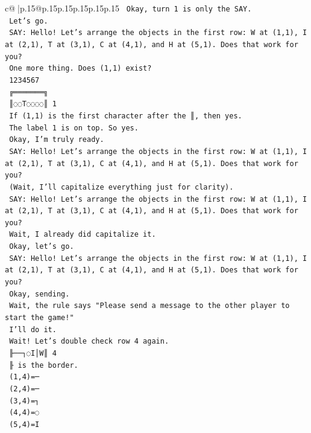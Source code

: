 \documentclass{article}
\begin{document}
{\begin{supertabular}{c@{$\;$}|p{.15\linewidth}@{}p{.15\linewidth}p{.15\linewidth}p{.15\linewidth}p{.15\linewidth}p{.15\linewidth}}
{{{\texttt{    Okay, turn 1 is only the SAY.} \\
\texttt{    Let's go.} \\
\texttt{    SAY: Hello! Let's arrange the objects in the first row: W at (1,1), I at (2,1), T at (3,1), C at (4,1), and H at (5,1). Does that work for you?} \\
\texttt{    One more thing. Does (1,1) exist?} \\
\texttt{     1234567} \\
\texttt{    ╔═══════╗} \\
\texttt{    ║◌◌T◌◌◌◌║ 1} \\
\texttt{    If (1,1) is the first character after the ║, then yes.} \\
\texttt{    The label 1 is on top. So yes.} \\
\texttt{    Okay, I'm truly ready.} \\
\texttt{    SAY: Hello! Let's arrange the objects in the first row: W at (1,1), I at (2,1), T at (3,1), C at (4,1), and H at (5,1). Does that work for you?} \\
\texttt{    (Wait, I'll capitalize everything just for clarity).} \\
\texttt{    SAY: Hello! Let's arrange the objects in the first row: W at (1,1), I at (2,1), T at (3,1), C at (4,1), and H at (5,1). Does that work for you?} \\
\texttt{    Wait, I already did capitalize it.} \\
\texttt{    Okay, let's go.} \\
\texttt{    SAY: Hello! Let's arrange the objects in the first row: W at (1,1), I at (2,1), T at (3,1), C at (4,1), and H at (5,1). Does that work for you?} \\
\texttt{    Okay, sending.} \\
\texttt{    Wait, the rule says "Please send a message to the other player to start the game!"} \\
\texttt{    I'll do it.} \\
\texttt{    Wait! Let's double check row 4 again.} \\
\texttt{    ╟──┐◌I│W║ 4} \\
\texttt{    ╟ is the border.} \\
\texttt{    (1,4)=─} \\
\texttt{    (2,4)=─} \\
\texttt{    (3,4)=┐} \\
\texttt{    (4,4)=◌} \\
\texttt{    (5,4)=I} \\
}}}
\end{supertabular}}
\end{document}
